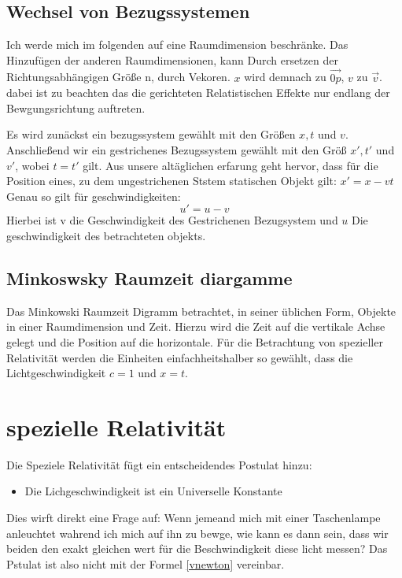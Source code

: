 \documentclass[12pt]{article}
\begin{document}
\subsection{Wechsel von Bezugssystemen}
Ich werde mich im folgenden auf eine Raumdimension beschränke.
Das Hinzufügen der anderen Raumdimensionen, kann Durch ersetzen der Richtungsabhängigen Größe
n, durch Vekoren.
$x$ wird demnach zu $\vec{0p}$, $v$ zu $\vec{v}$.
dabei ist zu beachten das die gerichteten Relatistischen Effekte nur endlang der Bewgungsrichtung auftreten.

Es wird zunäckst ein bezugssystem gewählt mit den Größen $x, t$ und $v$.
Anschließend wir ein gestrichenes Bezugssystem gewählt mit den Größ $x', t'$ und $v'$, wobei $t = t'$ gilt.
Aus unsere altäglichen erfarung geht hervor, dass für die Position eines, zu dem ungestrichenen Ststem statischen Objekt gilt: $x' = x-vt$
Genau so gilt für geschwindigkeiten:
\begin{equation}
\label{vnewton}
u' =u - v
\end{equation}
Hierbei ist v die Geschwindigkeit des Gestrichenen Bezugsystem und $u$ Die geschwindigkeit des betrachteten objekts.
\subsection{Minkoswsky Raumzeit diargamme}
Das Minkowski Raumzeit Digramm betrachtet, in seiner üblichen Form, Objekte in einer Raumdimension und Zeit.
Hierzu wird die Zeit auf die vertikale Achse gelegt und die Position auf die horizontale.
Für die Betrachtung von spezieller Relativität werden die Einheiten einfachheitshalber so gewählt, dass die Lichtgeschwindigkeit $c = 1$ und $x = t$.
\section{spezielle Relativität}
Die Speziele Relativität fügt ein entscheidendes Postulat hinzu:
\begin{itemize}
\item Die Lichgeschwindigkeit ist ein Universelle Konstante
\end{itemize}
Dies wirft direkt eine Frage auf:
Wenn jemeand mich mit einer Taschenlampe anleuchtet wahrend ich mich auf ihn zu bewge, wie kann es dann sein, dass wir beiden den exakt gleichen wert für die Beschwindigkeit diese licht messen?
Das Pstulat ist also nicht mit der Formel \ref{vnewton} vereinbar.
\end{document}
